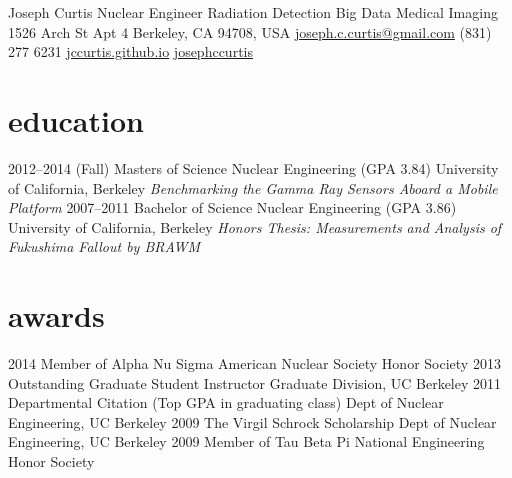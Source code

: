 \documentclass[print]{resume} %
\begin{document}
\header
{Joseph }
{Curtis}
{Nuclear Engineer}
{Radiation Detection \space \faPlusSign \space\space Big Data \space \faPlusSign \space\space Medical Imaging}
{1526 Arch St Apt 4 Berkeley, CA 94708, USA\space\space\faHome}
{\href{mailto:joseph.c.curtis@gmail.com}{joseph.c.curtis@gmail.com}\space\space\faEnvelopeAlt}
{(831) 277 6231\space\space\faPhone}
{\href{http://jccurtis.github.io}{jccurtis.github.io}\space\space\faGithub}
{\href{http://www.linkedin.com/in/josephccurtis}{josephccurtis}\space\space\faLinkedinSign}

\section{education}
\begin{entrylist}
\entry
{2012--2014 (Fall)}
{Masters of Science {\normalfont Nuclear Engineering (GPA 3.84)}}
{University of California, Berkeley}
{
\emph{Benchmarking the Gamma Ray Sensors Aboard a Mobile Platform}
}
\entry
{2007--2011}
{Bachelor of Science {\normalfont Nuclear Engineering (GPA 3.86)}}
{University of California, Berkeley}
{
\emph{Honors Thesis: Measurements and Analysis of Fukushima Fallout by BRAWM}
}
\end{entrylist}

\section{awards}
\begin{entrylist}
\entrymin
{2014}
{Member of Alpha Nu Sigma}
{American Nuclear Society Honor Society}
\entrymin
{2013}
{Outstanding Graduate Student Instructor}
{Graduate Division, UC Berkeley}
\entrymin
{2011}
{Departmental Citation (Top GPA in graduating class)}
{Dept of Nuclear Engineering, UC Berkeley}
\entrymin
{2009}
{The Virgil Schrock Scholarship}
{Dept of Nuclear Engineering, UC Berkeley}
\entrymin
{2009}
{Member of Tau Beta Pi}
{National Engineering Honor Society}
\end{entrylist}
\end{document}
